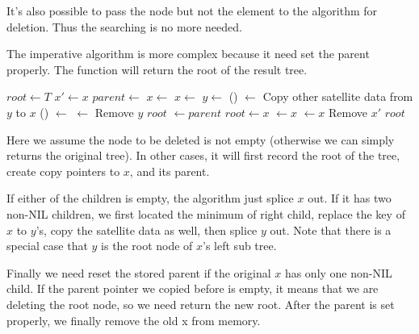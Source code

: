 \documentclass{article}
\begin{document}
It's also possible to pass the node but not the element to the
algorithm for deletion. Thus the searching is no more needed.

The imperative algorithm is more complex because it need set the
parent properly. The function will return the root of the result tree.

\begin{algorithmic}[1]
  \State $root \gets T$
  \State $x' \gets x$ 
  \State $parent \gets $ 
    \State $x \gets $ 
    \State $x \gets $ 
  \Else
    \State  $y \gets $ ()
    \State {} $\gets$ 
    \State Copy other satellite data from $y$ to $x$
      \State {}() $\gets$ 
    \Else
      \State {} $\gets$ 
    \EndIf
    \State Remove $y$
    \State \Return $root$
  \EndIf
    \State {} $\gets parent$
  \EndIf
    \State $root \gets x$
  \Else
      \State {} $\gets x$
    \Else
      \State {} $\gets x$
    \EndIf
  \EndIf
  \State Remove $x'$
  \State \Return $root$
\EndFunction
\end{algorithmic}

Here we assume the node to be deleted is not empty (otherwise we can
simply returns the original tree). In other cases, it will first record
the root of the tree, create copy pointers to $x$, and its parent.

If either of the children is empty, the algorithm just splice $x$ out.
If it has two non-NIL children, we first located the minimum of right
child, replace the key of $x$ to $y$'s, copy the satellite data as
well, then splice $y$ out. Note that there is a special case that $y$
is the root node of $x$'s left sub tree.

Finally we need reset the stored parent if the original $x$ has only
one non-NIL child.
If the parent pointer we copied before is empty, it
means that we are deleting the root node, so we need return the new root. After
the parent is set properly, we finally remove the old x from memory.
\end{document}
